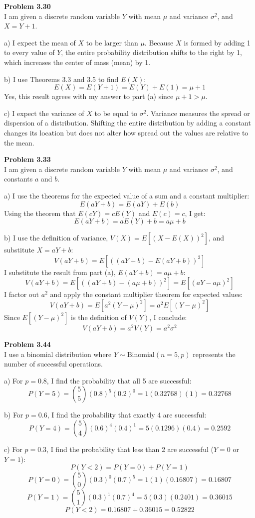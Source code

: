 \documentclass[12pt]{article}
\begin{document}
\textbf{Problem 3.30} \\
I am given a discrete random variable $Y$ with mean $\mu$ and variance $\sigma^2$, and $X = Y + 1$.

a) I expect the mean of $X$ to be larger than $\mu$. Because $X$ is formed by adding 1 to every value of $Y$, the entire probability distribution shifts to the right by 1, which increases the center of mass (mean) by 1.

b) I use Theorems 3.3 and 3.5 to find $E(X)$:
\[ E(X) = E(Y + 1) = E(Y) + E(1) = \mu + 1 \]
Yes, this result agrees with my answer to part (a) since $\mu + 1 > \mu$.

c) I expect the variance of $X$ to be equal to $\sigma^2$. Variance measures the spread or dispersion of a distribution. Shifting the entire distribution by adding a constant changes its location but does not alter how spread out the values are relative to the mean.

\textbf{Problem 3.33} \\
I am given a discrete random variable $Y$ with mean $\mu$ and variance $\sigma^2$, and constants $a$ and $b$.

a) I use the theorems for the expected value of a sum and a constant multiplier:
\[ E(aY + b) = E(aY) + E(b) \]
Using the theorem that $E(cY) = cE(Y)$ and $E(c) = c$, I get:
\[ E(aY + b) = aE(Y) + b = a\mu + b \]

b) I use the definition of variance, $V(X) = E[(X - E(X))^2]$, and substitute $X = aY + b$:
\[ V(aY + b) = E[((aY + b) - E(aY + b))^2] \]
I substitute the result from part (a), $E(aY + b) = a\mu + b$:
\[ V(aY + b) = E[((aY + b) - (a\mu + b))^2] = E[(aY - a\mu)^2] \]
I factor out $a^2$ and apply the constant multiplier theorem for expected values:
\[ V(aY + b) = E[a^2(Y - \mu)^2] = a^2E[(Y - \mu)^2] \]
Since $E[(Y - \mu)^2]$ is the definition of $V(Y)$, I conclude:
\[ V(aY + b) = a^2V(Y) = a^2\sigma^2 \]

\textbf{Problem 3.44} \\
I use a binomial distribution where $Y \sim \text{Binomial}(n=5, p)$ represents the number of successful operations.

a) For $p = 0.8$, I find the probability that all 5 are successful:
\[ P(Y = 5) = \binom{5}{5}(0.8)^5(0.2)^0 = 1(0.32768)(1) = 0.32768 \]

b) For $p = 0.6$, I find the probability that exactly 4 are successful:
\[ P(Y = 4) = \binom{5}{4}(0.6)^4(0.4)^1 = 5(0.1296)(0.4) = 0.2592 \]

c) For $p = 0.3$, I find the probability that less than 2 are successful ($Y = 0$ or $Y = 1$):
\[ P(Y < 2) = P(Y = 0) + P(Y = 1) \]
\[ P(Y = 0) = \binom{5}{0}(0.3)^0(0.7)^5 = 1(1)(0.16807) = 0.16807 \]
\[ P(Y = 1) = \binom{5}{1}(0.3)^1(0.7)^4 = 5(0.3)(0.2401) = 0.36015 \]
\[ P(Y < 2) = 0.16807 + 0.36015 = 0.52822 \]
\end{document}
